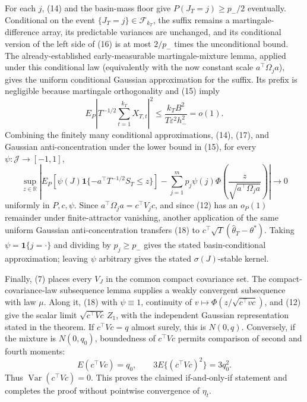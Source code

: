 For each \(j\), (14) and the basin-mass floor give \(P(J_T=j)\ge p_-/2\) eventually.  Conditional on the event \(\{J_T=j\}\in\mathcal F_{k_T}\), the suffix remains a martingale-difference array, its predictable variances are unchanged, and its conditional version of the left side of (16) is at most \(2/p_-\) times the unconditional bound.  The already-established early-measurable martingale-mixture lemma, applied under this conditional law (equivalently with the now constant scale \(a^\top\Omega_ja\)), gives the uniform conditional Gaussian approximation for the suffix.  Its prefix is negligible because martingale orthogonality and (15) imply
\[
 E_P\left|T^{-1/2}\sum_{t=1}^{k_T}X_{T,t}\right|^2
 \le \frac{k_TB^2}{T\varepsilon^2h_-^2}=o(1).                            \tag{17}
\]
Combining the finitely many conditional approximations, (14), (17), and Gaussian anti-concentration under the lower bound in (15), for every \(\psi:\mathcal J\to[-1,1]\),
\[
 \sup_{z\in\mathbb R}\left|
 E_P\!\left[\psi(J)\mathbf1\{-a^\top T^{-1/2}S_T\le z\}\right]
 -\sum_{j=1}^mp_j\psi(j)\Phi\!\left(\frac{z}{\sqrt{a^\top\Omega_ja}}\right)
 \right|\longrightarrow0                                                \tag{18}
\]
uniformly in \(P,c,\psi\).  Since \(a^\top\Omega_ja=c^\top V_jc\), and since (12) has an \(o_P(1)\) remainder under finite-attractor vanishing, another application of the same uniform Gaussian anti-concentration transfers (18) to \(c^\top\sqrt T(\widehat\theta_T-\theta^*)\).  Taking \(\psi=\mathbf1\{j=\cdot\}\) and dividing by \(p_j\ge p_-\) gives the stated basin-conditional approximation; leaving \(\psi\) arbitrary gives the stated \(\sigma(J)\)-stable kernel.

Finally, (7) places every \(V_J\) in the common compact covariance set.  The compact-covariance-law subsequence lemma supplies a weakly convergent subsequence with law \(\mu\).  Along it, (18) with \(\psi\equiv1\), continuity of \(v\mapsto\Phi(z/\sqrt{c^\top vc})\), and (12) give the scalar limit \(\sqrt{c^\top Vc}\,Z_1\), with the independent Gaussian representation stated in the theorem.  If \(c^\top Vc=q\) almost surely, this is \(N(0,q)\).  Conversely, if the mixture is \(N(0,q_0)\), boundedness of \(c^\top Vc\) permits comparison of second and fourth moments:
\[
 E(c^\top Vc)=q_0,
 \qquad
 3E\{(c^\top Vc)^2\}=3q_0^2.
\]
Thus \(\operatorname{Var}(c^\top Vc)=0\).  This proves the claimed if-and-only-if statement and completes the proof without pointwise convergence of \(\eta_t\).